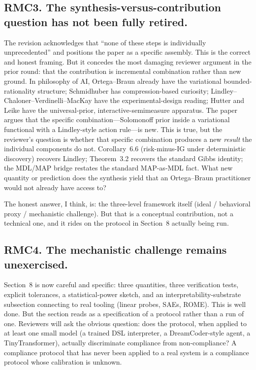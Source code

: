 \documentclass[11pt]{article}
\begin{document}
\subsection*{RMC3. The synthesis-versus-contribution question has not been fully retired.}

The revision acknowledges that ``none of these steps is individually unprecedented'' and positions the paper as a specific assembly. This is the correct and honest framing. But it concedes the most damaging reviewer argument in the prior round: that the contribution is incremental combination rather than new ground. In philosophy of AI, Ortega--Braun already have the variational bounded-rationality structure; Schmidhuber has compression-based curiosity; Lindley--Chaloner--Verdinelli--MacKay have the experimental-design reading; Hutter and Leike have the universal-prior, interactive-semimeasure apparatus. The paper argues that the specific combination---Solomonoff prior inside a variational functional with a Lindley-style action rule---is new. This is true, but the reviewer's question is whether that specific combination produces a new \emph{result} the individual components do not. Corollary~6.6 (risk-minus-IG under deterministic discovery) recovers Lindley; Theorem~3.2 recovers the standard Gibbs identity; the MDL/MAP bridge restates the standard MAP-as-MDL fact. What new quantity or prediction does the synthesis yield that an Ortega--Braun practitioner would not already have access to?

The honest answer, I think, is: the three-level framework itself (ideal / behavioral proxy / mechanistic challenge). But that is a conceptual contribution, not a technical one, and it rides on the protocol in Section~8 actually being run.

\subsection*{RMC4. The mechanistic challenge remains unexercised.}

Section~8 is now careful and specific: three quantities, three verification tests, explicit tolerances, a statistical-power sketch, and an interpretability-substrate subsection connecting to real tooling (linear probes, SAEs, ROME). This is well done. But the section reads as a specification of a protocol rather than a run of one. Reviewers will ask the obvious question: does the protocol, when applied to at least one small model (a trained DSL interpreter, a DreamCoder-style agent, a TinyTransformer), actually discriminate compliance from non-compliance? A compliance protocol that has never been applied to a real system is a compliance protocol whose calibration is unknown.
\end{document}

